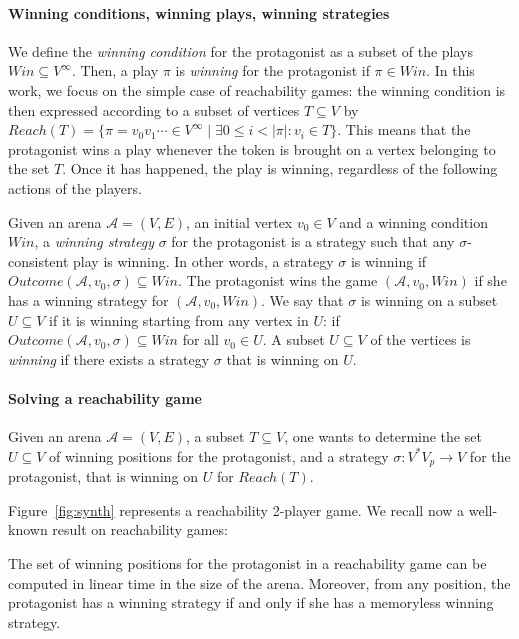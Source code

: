 \documentclass[envcountsame]{llncs} \usepackage[english]{babel}
\newcommand{\arena}{\ensuremath{\mathcal{A}}}
\newcommand{\Win}{\ensuremath{\mathit{Win}}}
\newcommand{\Reach}{\ensuremath{\mathit{Reach}}}
\newcommand{\Outcome}{\ensuremath{\mathit{Outcome}}}
\begin{document}
\paragraph{Winning conditions, winning plays, winning strategies}
 We define the \emph{winning condition} for the protagonist as a subset of the plays $\Win \subseteq V^\infty$.
 Then, a play $\pi$ is \emph{winning} for the protagonist if $\pi\in \Win$. In this work, we focus on the simple
 case of reachability games: the winning condition is then expressed according to a subset of vertices $T\subseteq V$
 by $\Reach(T)=\{\pi=v_0v_1\cdots \in V^\infty\mid \exists 0\leq i < |\pi|: v_i \in T\}$. This means that the protagonist
 wins a play whenever the token is brought on a vertex belonging to the set $T$. Once it has happened, the play
 is winning, regardless of the following actions of the players.


Given an arena $\arena=(V,E)$, an initial vertex $v_0\in V$ and a
winning condition $\Win$, a
\emph{winning strategy} $\sigma$ for the protagonist is a strategy such that
any $\sigma$-consistent play is winning. In other words, a strategy $\sigma$ is winning if
$\Outcome(\arena,v_0, \sigma) \subseteq Win$. The protagonist wins the game $(\arena,v_0,\Win)$
if she has a winning strategy for $(\arena,v_0,\Win)$.
We say that $\sigma$ is winning on a subset $U \subseteq V$ if it is winning
starting from any vertex in $U$:
if $\Outcome(\arena,v_0,\sigma)\subseteq \Win$ for all $v_0\in U$.  A subset
$U\subseteq V$ of the vertices is \emph{winning} if there exists
a strategy $\sigma$ that is winning on $U$.

\paragraph{Solving a reachability game} Given an arena $\arena=(V,E)$,
a subset $T\subseteq V$, one wants to determine the set $U\subseteq V$
of winning positions for the protagonist, and a strategy $\sigma:V^*V_p\rightarrow V$
for the protagonist, that is winning on $U$ for $\Reach(T)$.

Figure~\ref{fig:synth} represents a reachability 2-player game. We recall now a well-known result on reachability games:


\begin{theorem} \label{th:memoryless}The set of winning positions for the protagonist in a reachability
game can be computed in linear time in the size of the arena. Moreover, from any position, the protagonist
has a winning strategy if and only if she has a memoryless winning strategy.
\end{theorem}
\end{document}
